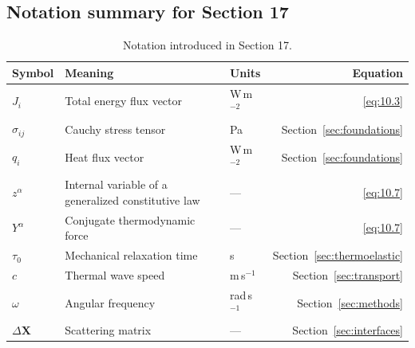 \subsection{Notation summary for Section 17}

\begin{table}[h]
\centering
\small
\caption{Notation introduced in Section 17.}
\label{tab:notation-sec17}
\begin{tabularx}{\textwidth}{@{}lXlr@{}}
\toprule
\textbf{Symbol} & \textbf{Meaning} & \textbf{Units} & \textbf{Equation} \\
\midrule
$J_i$ & Total energy flux vector & W\,m$^{-2}$ & \eqref{eq:10.3} \\
$\sigma_{ij}$ & Cauchy stress tensor & Pa & Section~\ref{sec:foundations} \\
$q_i$ & Heat flux vector & W\,m$^{-2}$ & Section~\ref{sec:foundations} \\
$z^\alpha$ & Internal variable of a generalized constitutive law & --- & \eqref{eq:10.7} \\
$Y^\alpha$ & Conjugate thermodynamic force & --- & \eqref{eq:10.7} \\
$\tau_0$ & Mechanical relaxation time & s & Section~\ref{sec:thermoelastic} \\
$c$ & Thermal wave speed & m\,s$^{-1}$ & Section~\ref{sec:transport} \\
$\omega$ & Angular frequency & rad\,s$^{-1}$ & Section~\ref{sec:methods} \\
$\Delta\bm{X}$ & Scattering matrix & --- & Section~\ref{sec:interfaces} \\
\bottomrule
\end{tabularx}
\end{table}

